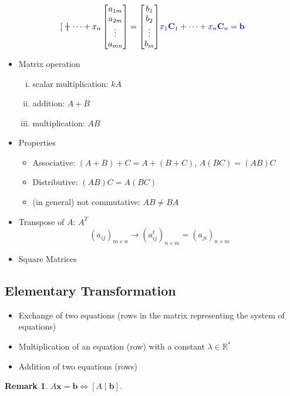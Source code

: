 \documentclass[12pt,openany]{book}
\theoremstyle{definition}
\newtheorem{remark}{Remark}[chapter]
\newcommand{\R}{\mathbb{R}}
\begin{document}
\begin{itemize}
\begin{align*}
\begin{bmatrix}
		\end{bmatrix}+\cdots+x_n\begin{bmatrix}
		a_{1m}\\ a_{2m}\\ \vdots\\ a_{mn}
		\end{bmatrix}=\begin{bmatrix}
		b_1\\ b_2\\ \vdots\\ b_{m} 
		\end{bmatrix} & \textcolor{blue}{x_1\textbf{C}_1+\cdots+x_n\textbf{C}_n=\textbf{b}}
		\end{align*}
		\item Matrix operation
		\begin{enumerate}[(i)]
			\item scalar multiplication: $kA$
			\item addition: $A+B$
			\item multiplication: $AB$
		\end{enumerate}
		\item Properties \begin{itemize}
			\item Associative: $(A+B)+C=A+(B+C)$, $A(BC)=(AB)C$
			\item Distributive: $(AB)C=A(BC)$
			\item (in general) not commutative: $AB\neq BA$
		\end{itemize}
		\item Transpose of $A$: $A^T$ \[
		(a_{ij})_{m\times n}\longrightarrow(a^t_{ij})_{n\times m}=(a_{ji})_{n\times m}
		\]
		\item Square Matrices
	\end{itemize}

	\subsection{Elementary Transformation}
	\begin{itemize}
		\item Exchange of two equations (rows in the matrix representing the system
		of equations)
		\item Multiplication of an equation (row) with a constant $\lambda\in\R^*$
		\item Addition of two equations (rows)
	\end{itemize}
	
	\begin{remark}
		$A\textbf{x}=\textbf{b}\iff[A\mid\textbf{b}]$.
	\end{remark}
	
\end{document}
